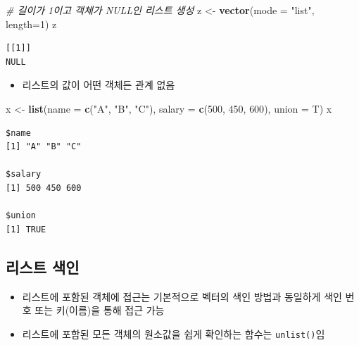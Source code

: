 \documentclass[
  11pt,
]{krantz}
\newenvironment{Shaded}{\begin{snugshade}}{\end{snugshade}}
\newcommand{\CommentTok}[1]{\textcolor[rgb]{0.37,0.37,0.37}{\textit{#1}}}
\newcommand{\DataTypeTok}[1]{\textcolor[rgb]{0.27,0.27,0.27}{#1}}
\newcommand{\DecValTok}[1]{\textcolor[rgb]{0.06,0.06,0.06}{#1}}
\newcommand{\KeywordTok}[1]{\textcolor[rgb]{0.27,0.27,0.27}{\textbf{#1}}}
\newcommand{\NormalTok}[1]{#1}
\newcommand{\StringTok}[1]{\textcolor[rgb]{0.5,0.5,0.5}{#1}}
\providecommand{\tightlist}{%
  \setlength{\itemsep}{0pt}\setlength{\parskip}{0pt}}
\begin{document}
\footnotesize

\begin{Shaded}
\begin{Highlighting}[]
\CommentTok{# 길이가 1이고 객체가 NULL인 리스트 생성}
\NormalTok{z <-}\StringTok{ }\KeywordTok{vector}\NormalTok{(}\DataTypeTok{mode =} \StringTok{"list"}\NormalTok{, }\DataTypeTok{length=}\DecValTok{1}\NormalTok{)}
\NormalTok{z}
\end{Highlighting}
\end{Shaded}

\begin{verbatim}
[[1]]
NULL
\end{verbatim}

\normalsize

\begin{itemize}
\tightlist
\item
  리스트의 값이 어떤 객체든 관계 없음
\end{itemize}

\footnotesize

\begin{Shaded}
\begin{Highlighting}[]
\NormalTok{x <-}\StringTok{ }\KeywordTok{list}\NormalTok{(}\DataTypeTok{name =} \KeywordTok{c}\NormalTok{(}\StringTok{"A"}\NormalTok{, }\StringTok{"B"}\NormalTok{, }\StringTok{"C"}\NormalTok{), }
          \DataTypeTok{salary =} \KeywordTok{c}\NormalTok{(}\DecValTok{500}\NormalTok{, }\DecValTok{450}\NormalTok{, }\DecValTok{600}\NormalTok{), }\DataTypeTok{union =}\NormalTok{ T)}
\NormalTok{x}
\end{Highlighting}
\end{Shaded}

\begin{verbatim}
$name
[1] "A" "B" "C"

$salary
[1] 500 450 600

$union
[1] TRUE
\end{verbatim}

\normalsize

\hypertarget{list-index}{%
\subsection{리스트 색인}\label{list-index}}

\begin{itemize}
\tightlist
\item
  리스트에 포함된 객체에 접근는 기본적으로 벡터의 색인 방법과 동일하게 색인 번호 또는 키(이름)을 통해 접근 가능
\item
  리스트에 포함된 모든 객체의 원소값을 쉽게 확인하는 함수는 \texttt{unlist()}임
\end{itemize}
\end{document}
